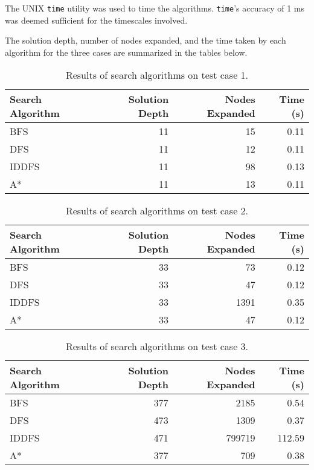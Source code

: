 \documentclass[12pt,letterpaper]{article}
\begin{document}

The UNIX {\tt time} utility was used to time the algorithms. {\tt time}'s
accuracy of 1 ms was deemed sufficient for the timescales involved.

The solution depth, number of nodes expanded, and the time taken by each
algorithm for the three cases are summarized in the tables below.

\begin{table}[!h]
	\centering
	\begin{tabular}{|l|r|r|r|} \hline
		Search Algorithm & Solution Depth & Nodes Expanded & Time (s) \\ \hline
		BFS   & 11 & 15 & 0.11 \\
		DFS   & 11 & 12 & 0.11 \\
		IDDFS & 11 & 98 & 0.13 \\
		A*    & 11 & 13 & 0.11 \\ \hline
	\end{tabular}
	\caption{Results of search algorithms on test case 1.}
	\label{tbl:case1}
\end{table}

\begin{table}[!h]
	\centering
	\begin{tabular}{|l|r|r|r|} \hline
		Search Algorithm & Solution Depth & Nodes Expanded & Time (s) \\ \hline
		BFS   & 33 & 73 & 0.12 \\
		DFS   & 33 & 47 & 0.12 \\
		IDDFS & 33 & 1391 & 0.35 \\
		A*    & 33 & 47 & 0.12 \\ \hline
	\end{tabular}
	\caption{Results of search algorithms on test case 2.}
	\label{tbl:case2}
\end{table}

\begin{table}[!h]
	\centering
	\begin{tabular}{|l|r|r|r|} \hline
		Search Algorithm & Solution Depth & Nodes Expanded & Time (s) \\ \hline
		BFS   & 377 & 2185 & 0.54 \\
		DFS   & 473 & 1309 & 0.37 \\
		IDDFS & 471 & 799719 & 112.59 \\
		A*    & 377 & 709 & 0.38 \\ \hline
	\end{tabular}
	\caption{Results of search algorithms on test case 3.}
	\label{tbl:case3}
\end{table}
\end{document}
